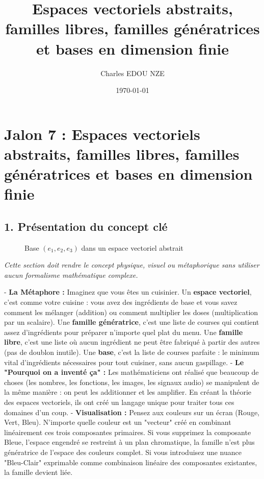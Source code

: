 \documentclass{report}
\title{Espaces vectoriels abstraits, familles libres, familles génératrices et bases en dimension finie}
\author{Charles EDOU NZE}
\date{\today}
\begin{document}
\maketitle
\tableofcontents
\newpage

\chapter*{Jalon 7 : Espaces vectoriels abstraits, familles libres, familles génératrices et bases en dimension finie}

\section*{1. Présentation du concept clé}

\begin{figure}[h]
\centering
{}
\caption{Base $(e_1, e_2, e_3)$ dans un espace vectoriel abstrait}
\end{figure}

\textit{Cette section doit rendre le concept physique, visuel ou métaphorique sans utiliser aucun formalisme mathématique complexe.}

- \textbf{La Métaphore :} Imaginez que vous êtes un cuisinier. Un \textbf{espace vectoriel}, c'est comme votre cuisine : vous avez des ingrédients de base et vous savez comment les mélanger (addition) ou comment multiplier les doses (multiplication par un scalaire). Une \textbf{famille génératrice}, c'est une liste de courses qui contient assez d'ingrédients pour préparer n'importe quel plat du menu. Une \textbf{famille libre}, c'est une liste où aucun ingrédient ne peut être fabriqué à partir des autres (pas de doublon inutile). Une \textbf{base}, c'est la liste de courses parfaite : le minimum vital d'ingrédients nécessaires pour tout cuisiner, sans aucun gaspillage.
- \textbf{Le "Pourquoi on a inventé ça" :} Les mathématiciens ont réalisé que beaucoup de choses (les nombres, les fonctions, les images, les signaux audio) se manipulent de la même manière : on peut les additionner et les amplifier. En créant la théorie des espaces vectoriels, ils ont créé un langage unique pour traiter tous ces domaines d'un coup.
- \textbf{Visualisation :} Pensez aux couleurs sur un écran (Rouge, Vert, Bleu). N'importe quelle couleur est un "vecteur" créé en combinant linéairement ces trois composantes primaires. Si vous supprimez la composante Bleue, l'espace engendré se restreint à un plan chromatique, la famille n'est plus génératrice de l'espace des couleurs complet. Si vous introduisez une nuance "Bleu-Clair" exprimable comme combinaison linéaire des composantes existantes, la famille devient liée.
\end{document}
